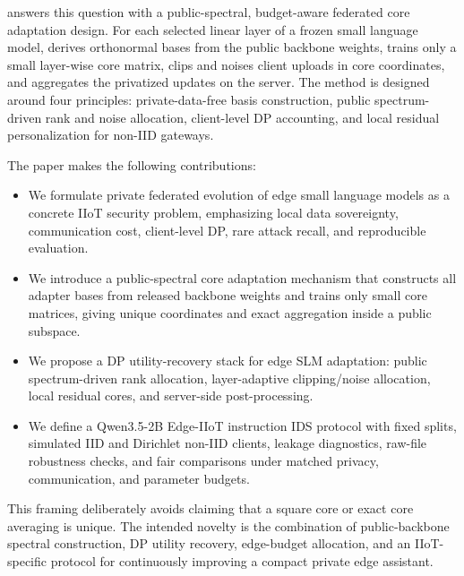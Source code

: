 \method answers this question with a public-spectral, budget-aware federated core adaptation design. For each selected linear layer of a frozen small language model, \method derives orthonormal bases from the public backbone weights, trains only a small layer-wise core matrix, clips and noises client uploads in core coordinates, and aggregates the privatized updates on the server. The method is designed around four principles: private-data-free basis construction, public spectrum-driven rank and noise allocation, client-level DP accounting, and local residual personalization for non-IID gateways.

The paper makes the following contributions:
\begin{itemize}[leftmargin=*]
  \item We formulate private federated evolution of edge small language models as a concrete IIoT security problem, emphasizing local data sovereignty, communication cost, client-level DP, rare attack recall, and reproducible evaluation.
  \item We introduce a public-spectral core adaptation mechanism that constructs all adapter bases from released backbone weights and trains only small core matrices, giving unique coordinates and exact aggregation inside a public subspace.
  \item We propose a DP utility-recovery stack for edge SLM adaptation: public spectrum-driven rank allocation, layer-adaptive clipping/noise allocation, local residual cores, and server-side post-processing.
  \item We define a Qwen3.5-2B Edge-IIoT instruction IDS protocol with fixed splits, simulated IID and Dirichlet non-IID clients, leakage diagnostics, raw-file robustness checks, and fair comparisons under matched privacy, communication, and parameter budgets.
\end{itemize}

This framing deliberately avoids claiming that a square core or exact core averaging is unique. The intended novelty is the combination of public-backbone spectral construction, DP utility recovery, edge-budget allocation, and an IIoT-specific protocol for continuously improving a compact private edge assistant.
